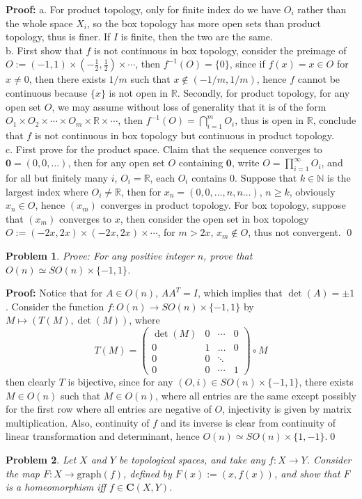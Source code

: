 \documentclass[12pt]{article}
\newtheorem{problem}{Problem}
\begin{document}
\textbf{Proof:} a. For product topology, only for finite index do we have $O_{i}$ rather than the whole space $X_{i}$, so the box topology has more open sets than product topology, thus is finer. If $I$ is finite, then the two are the same. \\
\indent b. First show that $f$ is not continuous in box topology, consider the preimage of $O:=(-1, 1)\times(-\frac{1}{2}, \frac{1}{2})\times\cdots$, then $f^{-1}(O)=\{0\}$, since if $f(x)=x\in O$ for $x\neq 0$, then there exists $1/m$ such that $x\notin (-1/m,1/m)$, hence $f$ cannot be continuous because $\{x\}$ is not open in $\mathbb{R}$. Secondly, for product topology, for any open set $O$, we may assume without loss of generality that it is of the form $O_{1}\times O_{2}\times\cdots\times O_{m}\times \mathbb{R}\times\cdots$, then $f^{-1}(O)=\bigcap_{i=1}^{m}O_{i}$, thus is open in $\mathbb{R}$, conclude that $f$ is not continuous in box topology but continuous in product topology. \\
\indent c. First prove for the product space. Claim that the sequence converges to $\textbf{0}=(0, 0, \dots)$, then for any open set $O$ containing $\textbf{0}$, write $O=\prod_{i=1}^{\infty}O_{i}$, and for all but finitely many $i$, $O_{i}=\mathbb{R}$, each $O_{i}$ contains $0$. Suppose that $k\in\mathbb{N}$ is the largest index where $O_{i}\neq \mathbb{R}$, then for $x_{n}=(0, 0, \dots, n, n\dots)$, $n\geq k$, obviously $x_{n}\in O$, hence $(x_{m})$ converges in product topology. For box topology, suppose that $(x_{m})$ converges to $x$, then consider the open set in box topology $O:= (-2x, 2x)\times (-2x, 2x)\times\cdots$, for $m>2x$, $x_{m}\notin O$, thus not convergent. \qed
\\
\begin{problem}
Prove: For any positive integer $n$, prove that $O(n)\simeq SO(n)\times \{-1, 1\}$.
\end{problem}

\textbf{Proof:} Notice that for $A\in O(n)$, $AA^{T}=I$, which implies that $\det(A)=\pm 1$. Consider the function $f: O(n)\to SO(n)\times \{-1, 1\}$ by $M\mapsto (T(M), \det(M))$, where
$$
T(M)= \begin{pmatrix} \det(M) & 0 &\cdots & 0 \\ 0 & 1 & \dots & 0\\ 0 & 0 & \ddots &\\ 0 & 0 & \cdots & 1\end{pmatrix} \circ M
$$
then clearly $T$ is bijective, since for any $(O, i)\in SO(n)\times \{-1, 1\}$, there exists $M\in O(n)$ such that $M\in O(n)$, where all entries are the same except possibly for the first row where all entries are negative of $O$, injectivity is given by matrix multiplication. Also, continuity of $f$ and its inverse is clear from continuity of linear transformation and determinant, hence $O(n)\simeq SO(n)\times \{1, -1\}$.\qed
\\
\begin{problem}
Let $X$ and $Y$ be topological spaces, and take any $f: X\to Y$. Consider the map $F: X\to \text{graph}(f)$, defined by $F(x):= (x, f(x))$, and show that $F$ is a homeomorphism iff $f\in\textbf{C}(X,Y)$.
\end{problem}
\end{document}
